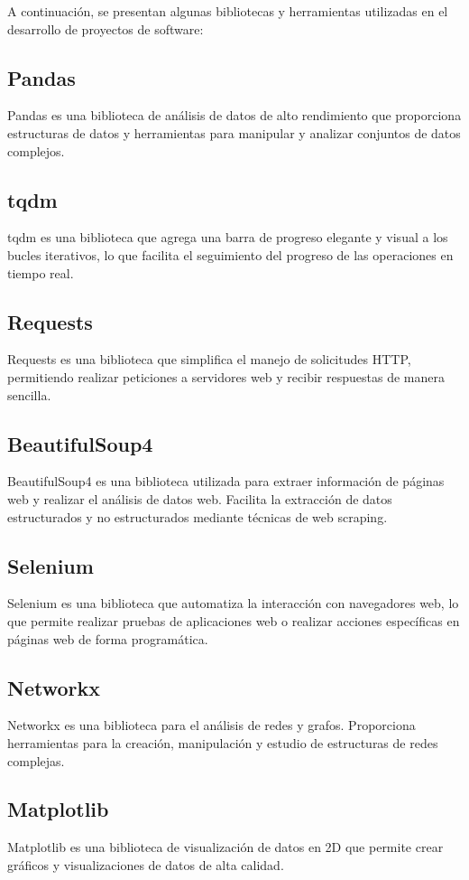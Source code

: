 A continuación, se presentan algunas bibliotecas y herramientas utilizadas en el desarrollo de proyectos de software:

\subsection{Pandas}
Pandas es una biblioteca de análisis de datos de alto rendimiento que proporciona estructuras de datos y herramientas para manipular y analizar conjuntos de datos complejos.

\subsection{tqdm}
tqdm es una biblioteca que agrega una barra de progreso elegante y visual a los bucles iterativos, lo que facilita el seguimiento del progreso de las operaciones en tiempo real.

\subsection{Requests}
Requests es una biblioteca que simplifica el manejo de solicitudes HTTP, permitiendo realizar peticiones a servidores web y recibir respuestas de manera sencilla.

\subsection{BeautifulSoup4}
BeautifulSoup4 es una biblioteca utilizada para extraer información de páginas web y realizar el análisis de datos web. Facilita la extracción de datos estructurados y no estructurados mediante técnicas de web scraping.

\subsection{Selenium}
Selenium es una biblioteca que automatiza la interacción con navegadores web, lo que permite realizar pruebas de aplicaciones web o realizar acciones específicas en páginas web de forma programática.

\subsection{Networkx}
Networkx es una biblioteca para el análisis de redes y grafos. Proporciona herramientas para la creación, manipulación y estudio de estructuras de redes complejas.

\subsection{Matplotlib}
Matplotlib es una biblioteca de visualización de datos en 2D que permite crear gráficos y visualizaciones de datos de alta calidad.

